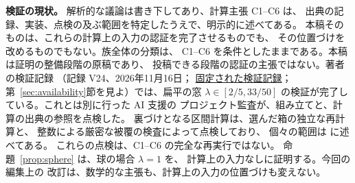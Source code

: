 \documentclass[11pt,a4paper]{article}
\numberwithin{equation}{section}
\theoremstyle{jplain}
\theoremstyle{jplain}
\theoremstyle{jplain}
\begin{document}
\noindent\textbf{検証の現状。}
解析的な議論は書き下してあり、計算主張 C1--C6 は、
出典の記録、実装、点検の及ぶ範囲を特定したうえで、明示的に述べてある。
本稿そのものは、これらの計算上の入力の認証を完了させるものでも、
その位置づけを改めるものでもない。族全体の分類は、
C1--C6 を条件としたままである。本稿は証明の整備段階の原稿であり、
投稿できる段階の認証の主張ではない。著者の検証記録
（記録 V24、2026年11月16日；
\href{https://github.com/cotaxxxx/bg-spheroid-family/blob/127be52046e9498d1306fe3d35c3e02e91c636de/runs/2026-11-16/D_OB_GLOBAL_CLOSED_V24/JUDGE_RULING_D_OB_GLOBAL_CLOSED_20261116.md}{固定された検証記録}；
第~\ref{sec:availability}節を見よ）では、扁平の窓
$\lambda\in[2/5,33/50]$ の検証が完了している。これとは別に行った AI 支援の
プロジェクト監査が、組み立てと、計算の出典の参照を点検した。
裏づけとなる区間計算は、選んだ箱の独立な再計算と、
整数による厳密な被覆の検査によって点検しており、
個々の範囲は  に述べてある。
これらの点検は、C1--C6 の完全な再実行ではない。
命題~\ref{prop:sphere} は、球の場合 $\lambda=1$ を、
計算上の入力なしに証明する。今回の編集上の
改訂は、数学的な主張も、計算上の入力の位置づけも変えない。
\clearpage
\tableofcontents
\clearpage




\begingroup
{}


\endgroup
\end{document}
